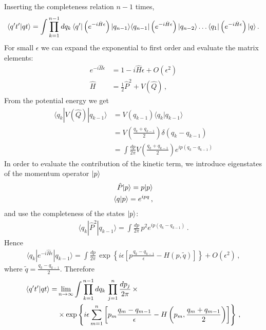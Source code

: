 Inserting the completeness relation $n-1$ times,
\begin{align}
  \label{eq:AmplitudeStepOne}
  \langle q't' | qt \rangle = \int \prod_{k=1}^{n-1}dq_k\,
  \langle q' | \left(e^{-i \hat{H} \epsilon}\right) |q_{n-1}\rangle
  \langle q_{n-1} | \left(e^{-i \hat{H} \epsilon}\right) |
  q_{n-2}\rangle \ldots \langle q_1 | \left(e^{-i \hat{H}
  \epsilon}\right) | q\rangle\, .
\end{align}
For small $\epsilon$ we can expand the exponential to first order and
evaluate the matrix elements:
\begin{align}
  e^{-i \hat{H} \epsilon} &= 1 - i \hat{H} \epsilon + O(\epsilon^2)\\
\hat{H} &= \frac12 \hat{P}^2 + V(\hat{Q})\, ,
\end{align}
From the potential energy we get
\begin{align}
  \langle q_k | V(\hat{Q}) | q_{k-1}\rangle &= V(q_{k-1}) \langle q_k
                                              | q_{k-1} \rangle \\
                                            &= V\left(\frac{q_k +
                                              q_{k-1}}{2}\right)
                                              \delta(q_k-q_{k-1}) \\
                                            & = \int \frac{dp}{2\pi} V\left(\frac{q_k +
                                              q_{k-1}}{2}\right) 
                                              e^{ip (q_k-q_{k-1})}
\end{align}
In order to evaluate the contribution of the kinetic term, we
introduce eigenstates of the momentum operator $| p \rangle$
\begin{align}
  \hat{P} | p \rangle = p | p \rangle \\
  \langle q | p \rangle = e^{ipq}\, ,
\end{align}
and use the completeness of the states $| p \rangle$:
\begin{align}
  \langle q_k | \hat{P}^2 | q_{k-1}\rangle = 
  \int \frac{dp}{2\pi}\, p^2 e^{ip(q_k-q_{k-1})}\, .
\end{align}
Hence
\begin{align}
  \langle q_k | e^{-i\hat{H}\epsilon} | q_{k-1}\rangle = 
  \int \frac{dp}{2\pi}\, \exp\left\{i\epsilon \left[
  p \frac{q_k-q_{k-1}}{\epsilon} - H\left(p,\tilde{q}\right)
  \right]
  \right\} + O(\epsilon^2)\, ,
\end{align}
where $\tilde{q}=\frac{q_k-q_{k-1}}{2}$. Therefore
\begin{align}
  \langle q't' | qt \rangle =& \lim_{n\to\infty} \int \prod_{k=1}^{n-1}dq_k\, 
  \prod_{j=1}^{n} \frac{dp_j}{2\pi}\, \times \\
  &\times \exp \left\{
    i\epsilon \sum_{m=1}^{n} \left[
    p_m \frac{q_m-q_{m-1}}{\epsilon} - H\left(p_m, 
    \frac{q_m+q_{m-1}}{2}\right)
    \right]
    \right\}\, ,
\end{align}
